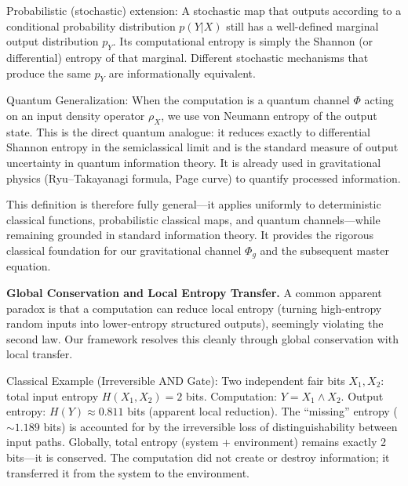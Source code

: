 \documentclass[reprint,amsmath,amssymb,aps,prd,preprintnumbers,superscriptaddress,longbibliography,10pt]{revtex4-2}
\begin{document}
Probabilistic (stochastic) extension: A stochastic map that outputs according to a conditional probability distribution \(p(Y|X)\) still has a well-defined marginal output distribution \(p_Y\). Its computational entropy is simply the Shannon (or differential) entropy of that marginal. Different stochastic mechanisms that produce the same \(p_Y\) are informationally equivalent.

Quantum Generalization: When the computation is a quantum channel \(\Phi\) acting on an input density operator \(\rho_X\), we use von Neumann entropy of the output state. This is the direct quantum analogue: it reduces exactly to differential Shannon entropy in the semiclassical limit and is the standard measure of output uncertainty in quantum information theory. It is already used in gravitational physics (Ryu–Takayanagi formula, Page curve) to quantify processed information.

This definition is therefore fully general—it applies uniformly to deterministic classical functions, probabilistic classical maps, and quantum channels—while remaining grounded in standard information theory. It provides the rigorous classical foundation for our gravitational channel \(\Phi_g\) and the subsequent master equation.

\textbf{Global Conservation and Local Entropy Transfer.} A common apparent paradox is that a computation can reduce local entropy (turning high-entropy random inputs into lower-entropy structured outputs), seemingly violating the second law. Our framework resolves this cleanly through global conservation with local transfer.

Classical Example (Irreversible AND Gate): Two independent fair bits \(X_1, X_2\): total input entropy \(H(X_1, X_2) = 2\) bits. Computation: \(Y = X_1 \land X_2\). Output entropy: \(H(Y) \approx 0.811\) bits (apparent local reduction). The “missing” entropy (\(\sim1.189\) bits) is accounted for by the irreversible loss of distinguishability between input paths. Globally, total entropy (system + environment) remains exactly 2 bits—it is conserved. The computation did not create or destroy information; it transferred it from the system to the environment.
\end{document}

